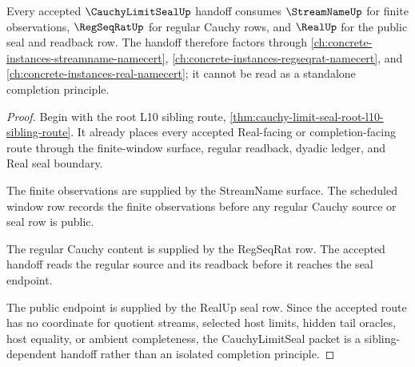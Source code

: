 \begin{theorem}
\label{thm:cauchy-limit-seal-regseq-real-sibling-dependency}
Every accepted $\CauchyLimitSealUp$ handoff consumes $\StreamNameUp$ for finite observations, $\RegSeqRatUp$ for regular Cauchy rows, and $\RealUp$ for the public seal and readback row. The handoff therefore factors through \autoref{ch:concrete-instances-streamname-namecert}, \autoref{ch:concrete-instances-regseqrat-namecert}, and \autoref{ch:concrete-instances-real-namecert}; it cannot be read as a standalone completion principle.
\end{theorem}
\begin{proof}
Begin with the root L10 sibling route, \autoref{thm:cauchy-limit-seal-root-l10-sibling-route}. It already places every accepted Real-facing or completion-facing route through the finite-window surface, regular readback, dyadic ledger, and Real seal boundary.

The finite observations are supplied by the StreamName surface. The scheduled window row records the finite observations before any regular Cauchy source or seal row is public.

The regular Cauchy content is supplied by the RegSeqRat row. The accepted handoff reads the regular source and its readback before it reaches the seal endpoint.

The public endpoint is supplied by the RealUp seal row. Since the accepted route has no coordinate for quotient streams, selected host limits, hidden tail oracles, host equality, or ambient completeness, the CauchyLimitSeal packet is a sibling-dependent handoff rather than an isolated completion principle.
\end{proof}

